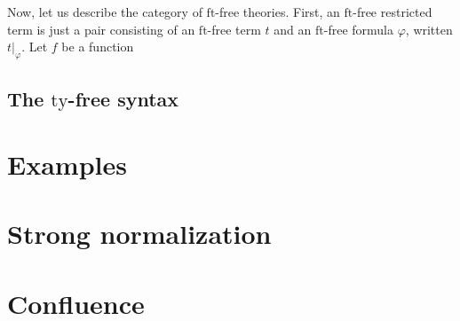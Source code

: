 \documentclass[reqno]{amsart}
\theoremstyle{definition}
\theoremstyle{remark}
\newcommand{\fs}[1]{\mathrm{#1}}
\newcommand{\ft}{\fs{ft}}
\newcommand{\ty}{\fs{ty}}
\numberwithin{figure}{section}
\begin{document}
Now, let us describe the category of $\ft$-free theories.
First, an $\ft$-free restricted term is just a pair consisting of an $\ft$-free term $t$ and an $\ft$-free formula $\varphi$, written $t|_\varphi$.
Let $f$ be a function 

\subsection{The $\ty$-free syntax}
\label{sec:types}

\section{Examples}

\section{Strong normalization}

\section{Confluence}



\end{document}
